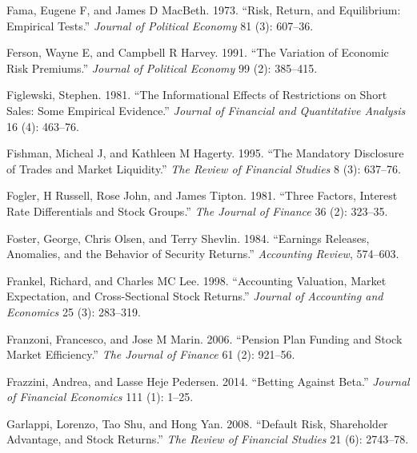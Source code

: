 \documentclass[
  letterpaper,
  DIV=11,
  numbers=noendperiod]{scrreprt}
\newlength{\cslhangindent}
\newlength{\cslentryspacingunit} %
\newenvironment{CSLReferences}[2] %
 {%
  \setlength{\parindent}{0pt}
  \ifodd #1
  \let\oldpar\par
  \def\par{\hangindent=\cslhangindent\oldpar}
  \fi
  \setlength{\parskip}{#2\cslentryspacingunit}
 }%
 {}
\begin{document}
\begin{CSLReferences}{1}{0}
\leavevmode{}%
Fama, Eugene F, and James D MacBeth. 1973. {``Risk, Return, and
Equilibrium: Empirical Tests.''} \emph{Journal of Political Economy} 81
(3): 607--36.

\leavevmode{}%
Ferson, Wayne E, and Campbell R Harvey. 1991. {``The Variation of
Economic Risk Premiums.''} \emph{Journal of Political Economy} 99 (2):
385--415.

\leavevmode{}%
Figlewski, Stephen. 1981. {``The Informational Effects of Restrictions
on Short Sales: Some Empirical Evidence.''} \emph{Journal of Financial
and Quantitative Analysis} 16 (4): 463--76.

\leavevmode{}%
Fishman, Micheal J, and Kathleen M Hagerty. 1995. {``The Mandatory
Disclosure of Trades and Market Liquidity.''} \emph{The Review of
Financial Studies} 8 (3): 637--76.

\leavevmode{}%
Fogler, H Russell, Rose John, and James Tipton. 1981. {``Three Factors,
Interest Rate Differentials and Stock Groups.''} \emph{The Journal of
Finance} 36 (2): 323--35.

\leavevmode{}%
Foster, George, Chris Olsen, and Terry Shevlin. 1984. {``Earnings
Releases, Anomalies, and the Behavior of Security Returns.''}
\emph{Accounting Review}, 574--603.

\leavevmode{}%
Frankel, Richard, and Charles MC Lee. 1998. {``Accounting Valuation,
Market Expectation, and Cross-Sectional Stock Returns.''} \emph{Journal
of Accounting and Economics} 25 (3): 283--319.

\leavevmode{}%
Franzoni, Francesco, and Jose M Marin. 2006. {``Pension Plan Funding and
Stock Market Efficiency.''} \emph{The Journal of Finance} 61 (2):
921--56.

\leavevmode{}%
Frazzini, Andrea, and Lasse Heje Pedersen. 2014. {``Betting Against
Beta.''} \emph{Journal of Financial Economics} 111 (1): 1--25.

\leavevmode{}%
Garlappi, Lorenzo, Tao Shu, and Hong Yan. 2008. {``Default Risk,
Shareholder Advantage, and Stock Returns.''} \emph{The Review of
Financial Studies} 21 (6): 2743--78.


\end{CSLReferences}
\end{document}
